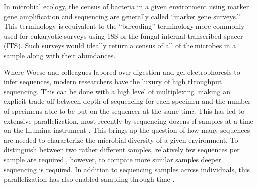 \documentclass{amsart}
\begin{document}
In microbial ecology, the census of bacteria in a given environment using marker gene amplification and sequencing are generally called ``marker gene surveys.''
This terminology is equivalent to the ``barcoding'' terminology more commonly used for eukaryotic surveys using 18S or the fungal internal transcribed spacer (ITS).
Such surveys would ideally return a census of all of the microbes in a sample along with their abundances.

Where Woese and colleagues labored over digestion and gel electrophoresis to infer sequences, modern researchers have the luxury of high throughput sequencing.
This can be done with a high level of multiplexing, making an explicit trade-off between depth of sequencing for each specimen and the number of specimens able to be put on the sequencer at the same time.
This has led to extensive parallelization, most recently by sequencing dozens of samples at a time on the Illumina instrument \citep{degnan2011illumina,caporaso2012ultra}.
This brings up the question of how many sequences are needed to characterize the microbial diversity of a given environment.
To distinguish between two rather different samples, relatively few sequences per sample are required \citep{kuczynski2010microbial}, however, to compare more similar samples deeper sequencing is required.
In addition to sequencing samples across individuals, this parallelization has also enabled sampling through time \citep[e.g.][]{caporaso2011moving}.
\end{document}

